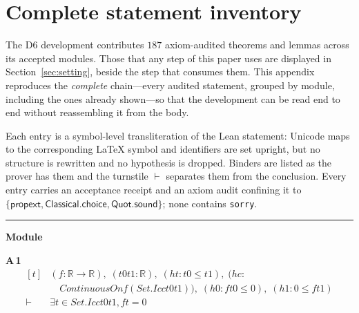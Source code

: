 \appendices
\section{Complete statement inventory}
\label{app:inventory}

The D6 development contributes $187$ axiom-audited theorems and lemmas across its accepted modules. Those that any step of this paper uses are displayed in Section~\ref{sec:setting}, beside the step that consumes them. This appendix reproduces the \emph{complete} chain---every audited statement, grouped by module, including the ones already shown---so that the development can be read end to end without reassembling it from the body.

Each entry is a symbol-level transliteration of the Lean statement: Unicode maps to the corresponding \LaTeX{} symbol and identifiers are set upright, but no structure is rewritten and no hypothesis is dropped. Binders are listed as the prover has them and the turnstile $\vdash$ separates them from the conclusion. Every entry carries an acceptance receipt and an axiom audit confining it to $\{\textsf{propext},\textsf{Classical.choice},\textsf{Quot.sound}\}$; none contains \texttt{sorry}.

\vspace{4pt}\noindent\rule{\columnwidth}{0.4pt}\par\vspace{2pt}
\noindent\textbf{Module }\par\vspace{3pt}

\noindent\textbf{A\,1}\quad{}
{\footnotesize\[ \begin{aligned}[t]
&(\mathit{f} : \mathbb{R} \to \mathbb{R} ),\; (\mathit{t0} \mathit{t1} : \mathbb{R} ),\; (\mathit{ht} : \mathit{t0} \leq \mathit{t1}),\; (\mathit{hc} :\\
&\quad \mathit{ContinuousOn} \mathit{f} (\mathit{Set}.\mathit{Icc} \mathit{t0} \mathit{t1})),\; (\mathit{h0} : \mathit{f} \mathit{t0} \leq 0),\; (\mathit{h1} : 0 \leq \mathit{f} \mathit{t1})\\
\vdash\;&\exists \mathit{t} \in \mathit{Set}.\mathit{Icc} \mathit{t0} \mathit{t1}, \mathit{f} \mathit{t} = 0
\end{aligned} \]}

